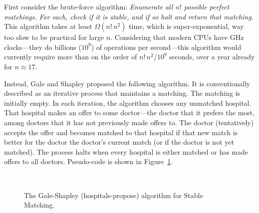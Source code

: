 \documentclass[11pt]{article}
\begin{document}
First consider the brute-force algorithm: \emph{Enumerate all $n{!}$ possible perfect matchings.  For each, check if it is stable, and if so halt and return that matching.}
%
This algorithm takes at least $\Omega(n!\, n^2)$ time, which is super-exponential, way too slow to be practical for large $n$.
Considering that modern CPUs have GHz clocks---they do billions ($10^9$) of operations per second---this
algorithm would currently require more than on the order of $n!\,n^2/10^9$ seconds, over a year already for $n\approx 17$.

Instead, Gale and Shapley proposed the following algorithm.
It is conventionally described as an iterative process that maintains a matching.
The matching is initially empty.
In each iteration, the algorithm chooses any unmatched hospital.
That hospital makes an offer to some doctor---the doctor that it prefers the most,
among doctors that it has not previously made offers to.
The doctor (tentatively) accepts the offer and becomes matched to that hospital
if that new match is better for the doctor the doctor's current match (or if the doctor is not yet matched).
The process halts when every hospital is either matched or has made offers to all doctors.
Pseudo-code is shown in Figure~\ref{matching: fig: alg}.



\begin{figure}[t]
\noindent~
\caption{The Gale-Shapley (hospitals-propose) algorithm for Stable Matching.}\label{matching: fig: alg}
\end{figure}
\end{document}
